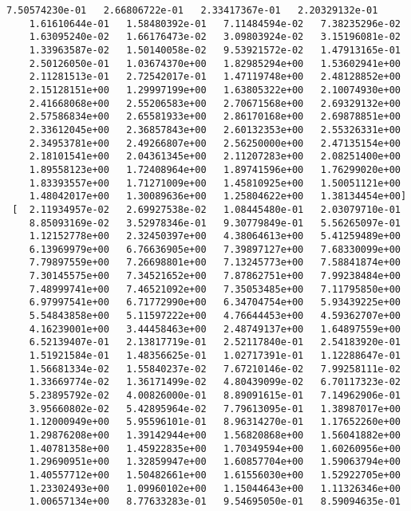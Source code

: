 \documentclass{article}
\begin{document}
\begin{Verbatim}[commandchars=\\\{\}]
    7.50574230e-01   2.66806722e-01   2.33417367e-01   2.20329132e-01
    1.61610644e-01   1.58480392e-01   7.11484594e-02   7.38235296e-02
    1.63095240e-02   1.66176473e-02   3.09803924e-02   3.15196081e-02
    1.33963587e-02   1.50140058e-02   9.53921572e-02   1.47913165e-01
    2.50126050e-01   1.03674370e+00   1.82985294e+00   1.53602941e+00
    2.11281513e-01   2.72542017e-01   1.47119748e+00   2.48128852e+00
    2.15128151e+00   1.29997199e+00   1.63805322e+00   2.10074930e+00
    2.41668068e+00   2.55206583e+00   2.70671568e+00   2.69329132e+00
    2.57586834e+00   2.65581933e+00   2.86170168e+00   2.69878851e+00
    2.33612045e+00   2.36857843e+00   2.60132353e+00   2.55326331e+00
    2.34953781e+00   2.49266807e+00   2.56250000e+00   2.47135154e+00
    2.18101541e+00   2.04361345e+00   2.11207283e+00   2.08251400e+00
    1.89558123e+00   1.72408964e+00   1.89741596e+00   1.76299020e+00
    1.83393557e+00   1.71271009e+00   1.45810925e+00   1.50051121e+00
    1.48042017e+00   1.30089636e+00   1.25804622e+00   1.38134454e+00]
 [  2.11934957e-02   2.69927538e-02   1.08445480e-01   2.03079710e-01
    8.85093169e-02   3.52978346e-01   9.30779849e-01   5.56265097e-01
    1.12152778e+00   2.32450397e+00   4.38064613e+00   5.41259489e+00
    6.13969979e+00   6.76636905e+00   7.39897127e+00   7.68330099e+00
    7.79897559e+00   7.26698801e+00   7.13245773e+00   7.58841874e+00
    7.30145575e+00   7.34521652e+00   7.87862751e+00   7.99238484e+00
    7.48999741e+00   7.46521092e+00   7.35053485e+00   7.11795850e+00
    6.97997541e+00   6.71772990e+00   6.34704754e+00   5.93439225e+00
    5.54843858e+00   5.11597222e+00   4.76644453e+00   4.59362707e+00
    4.16239001e+00   3.44458463e+00   2.48749137e+00   1.64897559e+00
    6.52139407e-01   2.13817719e-01   2.52117840e-01   2.54183920e-01
    1.51921584e-01   1.48356625e-01   1.02717391e-01   1.12288647e-01
    1.56681334e-02   1.55840237e-02   7.67210146e-02   7.99258111e-02
    1.33669774e-02   1.36171499e-02   4.80439099e-02   6.70117323e-02
    5.23895792e-02   4.00826000e-01   8.89091615e-01   7.14962906e-01
    3.95660802e-02   5.42895964e-02   7.79613095e-01   1.38987017e+00
    1.12000949e+00   5.95596101e-01   8.96314270e-01   1.17652260e+00
    1.29876208e+00   1.39142944e+00   1.56820868e+00   1.56041882e+00
    1.40781358e+00   1.45922835e+00   1.70349594e+00   1.60260956e+00
    1.29690951e+00   1.32859947e+00   1.60857704e+00   1.59063794e+00
    1.40557712e+00   1.50482661e+00   1.61556030e+00   1.52922705e+00
    1.23302493e+00   1.09960102e+00   1.15044643e+00   1.11326346e+00
    1.00657134e+00   8.77633283e-01   9.54695050e-01   8.59094635e-01

\end{Verbatim}
\end{document}
